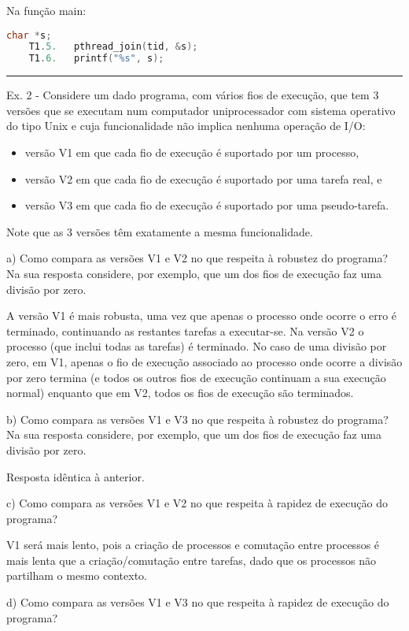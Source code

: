 \documentclass[11pt]{article}
\begin{document}
Na função main:

\begin{lstlisting}[language=C]
            char *s;
    T1.5.   pthread_join(tid, &s);
    T1.6.   printf("%s", s);
\end{lstlisting}

\hrule

Ex. 2 - Considere um dado programa, com vários fios de execução, que tem 3 versões que se executam num computador uniprocessador com sistema operativo do tipo Unix e cuja funcionalidade não implica nenhuma operação de I/O:

\begin{itemize}
    \item versão V1 em que cada fio de execução é suportado por um processo,
    \item versão V2 em que cada fio de execução é suportado por uma tarefa real, e
    \item versão V3 em que cada fio de execução é suportado por uma pseudo-tarefa.
\end{itemize}

Note que as 3 versões têm exatamente a mesma funcionalidade.

a) Como compara as versões V1 e V2 no que respeita à robustez do programa? Na sua resposta considere, por exemplo, que um dos fios de execução faz uma divisão por zero.

A versão V1 é mais robusta, uma vez que apenas o processo onde ocorre o erro é terminado, continuando as restantes tarefas a executar-se. Na versão V2 o processo (que inclui todas as tarefas) é terminado. No caso de uma divisão por zero, em V1, apenas o fio de execução associado ao processo onde ocorre a divisão por zero termina (e todos os outros fios de execução continuam a sua execução normal) enquanto que em V2, todos os fios de execução são terminados.

b) Como compara as versões V1 e V3 no que respeita à robustez do programa? Na sua resposta considere, por exemplo, que um dos fios de execução faz uma divisão por zero.

Resposta idêntica à anterior.

c) Como compara as versões V1 e V2 no que respeita à rapidez de execução do programa?

V1 será mais lento, pois a criação de processos e comutação entre processos é mais lenta que a criação/comutação entre tarefas, dado que os processos não partilham o mesmo contexto.

d) Como compara as versões V1 e V3 no que respeita à rapidez de execução do programa?
\end{document}
